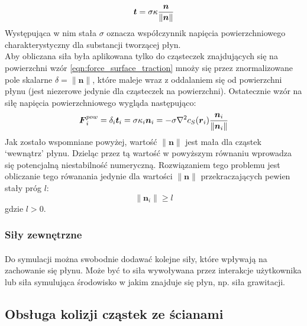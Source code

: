 \begin{equation}
\boldsymbol{t} = \sigma \kappa {\boldsymbol{n} \over \|\boldsymbol{n}\|}
\label{eqn:force_surface_traction}
\end{equation}
Występująca w nim stała $\sigma$ oznacza współczynnik napięcia powierzchniowego charakterystyczny dla substancji tworzącej płyn.\\
Aby obliczana siła była aplikowana tylko do cząsteczek znajdujących się na powierzchni wzór \eqref{eqn:force_surface_traction} mnoży się przez znormalizowane pole skalarne $\delta = \|\boldsymbol{n}\|$, które maleje wraz z oddalaniem się od powierzchni płynu (jest niezerowe jedynie dla cząsteczek na powierzchni). Ostatecznie wzór na siłę napięcia powierzchniowego wygląda następująco:
\begin{equation}
\boldsymbol{F}_i^{pow} = \delta_i \boldsymbol{t}_i = \sigma \kappa_i \boldsymbol{n}_i = - \sigma \nabla^2{c}_S(\boldsymbol{r}_i) {\boldsymbol{n}_i \over \|\boldsymbol{n}_i\|}
\label{eqn:sph_force_surface_tension}
\end{equation}
Jak zostało wspomniane powyżej, wartość $\|\boldsymbol{n}\|$ jest mała dla cząstek `wewnątrz' płynu. Dzieląc przez tą wartość w powyższym równaniu wprowadza się potencjalną niestabilność numeryczną. Rozwiązaniem tego problemu jest obliczanie tego rówanania jedynie dla wartości $\|\boldsymbol{n}\|$ przekraczających pewien stały próg $l$:
\begin{equation}
\|\boldsymbol{n}_i\| \geq l
\label{eqn:sph_force_surface_tension_threshold}
\end{equation}
gdzie $l > 0$.\\
\par

\subsubsection{Siły zewnętrzne}

\paragraph{}
Do symulacji można swobodnie dodawać kolejne siły, które wpływają na zachowanie się płynu. Może być to siła wywoływana przez interakcje użytkownika lub siła symulująca środowisko w jakim znajduje się płyn, np. siła grawitacji.
\par


\subsection{Obsługa kolizji cząstek ze ścianami}

